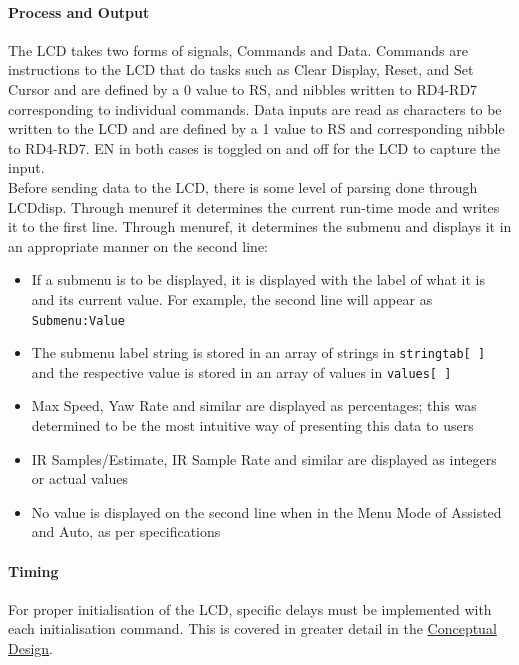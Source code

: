 \documentclass{article}
\begin{document}
\paragraph{Process and Output}

The LCD takes two forms of signals, Commands and Data. Commands are instructions to the LCD that do tasks such as Clear Display, Reset, and Set Cursor and are defined by a 0 value to RS, and nibbles written to RD4-RD7 corresponding to individual commands. Data inputs are read as characters to be written to the LCD and are defined by a 1 value to RS and corresponding nibble to RD4-RD7. EN in both cases is toggled on and off for the LCD to capture the input.\\

Before sending data to the LCD, there is some level of parsing done through LCD\textunderscore disp. Through menu\textunderscore ref it determines the current run-time mode and writes it to the first line. Through menu\textunderscore ref, it determines the submenu and displays it in an appropriate manner on the second line:
\begin{itemize}
	\item If a submenu is to be displayed, it is displayed with the label of what it is and its current value. For example, the second line will appear as \texttt{Submenu:Value}
	\item The submenu label string is stored in an array of strings in \texttt{stringtab[ ]} and the respective value is stored in an array of values in \texttt{values[ ]}
	\item Max Speed, Yaw Rate and similar are displayed as percentages; this was determined to be the most intuitive way of presenting this data to users
	\item IR Samples/Estimate, IR Sample Rate and similar are displayed as integers or actual values
	\item No value is displayed on the second line when in the Menu Mode of Assisted and Auto, as per specifications
\end{itemize}


\paragraph{Timing}
For proper initialisation of the LCD, specific delays must be implemented with each initialisation command. This is covered in greater detail in the \underline{Conceptual Design}.
\end{document}
